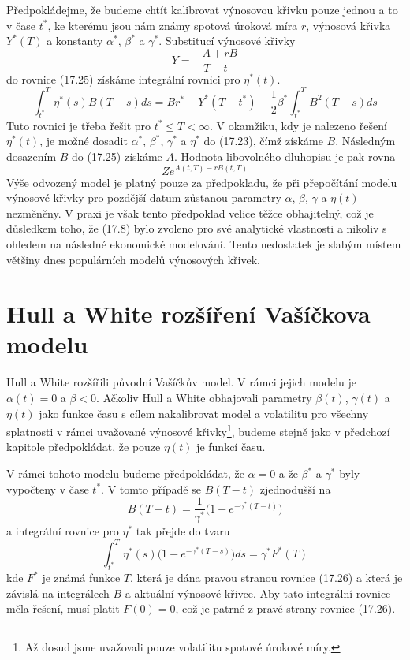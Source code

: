 \documentclass[a4paper]{book}
\begin{document}
Předpokládejme, že budeme chtít kalibrovat výnosovou křivku pouze jednou a to v čase $t^{*}$, ke kterému jsou nám známy spotová úroková míra $r$, výnosová křivka $Y^{*}(T)$ a konstanty $\alpha^{*}$, $\beta^{*}$ a $\gamma^{*}$. Substitucí výnosové křivky
\begin{equation*}
Y = \frac{-A + rB}{T - t}
\end{equation*}   
do rovnice (17.25) získáme integrální rovnici pro $\eta^{*}(t)$.
\begin{equation}
\int_{t^{*}}^T \eta^{*}(s)B(T-s)ds = Br^{*} - Y^{*}(T-t^{*}) - \frac{1}{2} \beta^{*} \int_{t^{*}}^T B^2(T - s)ds
\end{equation}
Tuto rovnici je třeba řešit pro $t^{*} \le T < \infty$. V okamžiku, kdy je nalezeno řešení $\eta^{*}(t)$, je možné dosadit $\alpha^{*}$, $\beta^{*}$, $\gamma^{*}$ a $\eta^{*}$ do (17.23), čímž získáme $B$. Následným dosazením $B$ do (17.25) získáme $A$. Hodnota libovolného dluhopisu je pak rovna
\begin{equation*}
Ze^{A(t,T) - rB(t,T)}
\end{equation*}
Výše odvozený model je platný pouze za předpokladu, že při přepočítání modelu výnosové křivky pro pozdější datum zůstanou parametry $\alpha$, $\beta$, $\gamma$ a $\eta(t)$ nezměněny. V praxi je však tento předpoklad velice těžce obhajitelný, což je důsledkem toho, že (17.8) bylo zvoleno pro své analytické vlastnosti a nikoliv s ohledem na následné ekonomické modelování. Tento nedostatek je slabým místem většiny dnes populárních modelů výnosových křivek.

\section{Hull a White rozšíření Vašíčkova modelu}

Hull a White rozšířili původní Vašíčkův model. V rámci jejich modelu je $\alpha(t) = 0$ a $\beta < 0$. Ačkoliv Hull a White obhajovali parametry $\beta(t)$, $\gamma(t)$ a $\eta(t)$ jako funkce času s cílem nakalibrovat model a volatilitu pro všechny splatnosti v rámci uvažované výnosové křivky\footnote{Až dosud jsme uvažovali pouze volatilitu spotové úrokové míry.}, budeme stejně jako v předchozí kapitole předpokládat, že pouze $\eta(t)$ je funkcí času.

V rámci tohoto modelu budeme předpokládat, že $\alpha = 0$ a že $\beta^{*}$ a $\gamma^{*}$ byly vypočteny v čase $t^{*}$. V tomto případě se $B(T - t)$ zjednodušší na
\begin{equation*}
B(T - t) = \frac{1}{\gamma^{*}} \Bigg( 1 - e^{-\gamma^{*}(T - t)}\Bigg)
\end{equation*}
a integrální rovnice pro $\eta^{*}$ tak přejde do tvaru
\begin{equation}
\int_{t^{*}}^T \eta^{*}(s) \Bigg( 1 - e^{-\gamma^{*}(T - s)}\Bigg)ds = \gamma^{*}F^{*}(T)
\end{equation}
kde $F^{*}$ je známá funkce $T$, která je dána pravou stranou rovnice (17.26) a která je závislá na integrálech $B$ a aktuální výnosové křivce. Aby tato integrální rovnice měla řešení, musí platit $F(0) = 0$, což je patrné z pravé strany rovnice (17.26).
\end{document}
